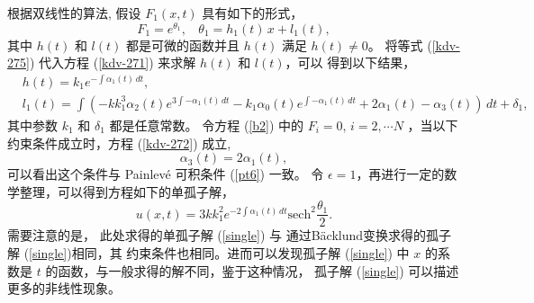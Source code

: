 根据双线性的算法, 假设 $F_1(x,t)$ 具有如下的形式，
\begin{equation}
 F_1=e^{\theta_1},\ \ \ \  \theta_1=h_1(t)\,x+l_1(t), \label{kdv-275}
\end{equation}
其中 $ h(t) $ 和 $ l(t) $ 都是可微的函数并且 $h(t)$ 满足 $ h(t)\neq 0 $。
将等式 (\ref{kdv-275}) 代入方程 (\ref{kdv-271}) 来求解 $ h(t) $ 和 $ l(t) $，可以
得到以下结果，
\begin{align}
&h(t)=k_1 e^{-\int \alpha _1(t) \, dt},
\\&
l_1(t)=\int \left(- k k_1^3 \alpha _2(t)e^{3 \int -\alpha _1(t) \, dt}-k_1 \alpha _0(t) e^{\int -\alpha _1(t) \, dt}+2 \alpha _1(t)-\alpha _3(t)\right) \, dt+ \delta_1,
\end{align}
其中参数 $k_1$ 和 $\delta_1$ 都是任意常数。
令方程 (\ref{b2}) 中的 $F_i=0, \,i=2,\cdots N $ ，当以下约束条件成立时，方程 (\ref{kdv-272}) 成立,
\begin{equation}
\alpha _3(t)=2\alpha _1(t),\label{kdv-b3}
\end{equation}
可以看出这个条件与 Painlev\'{e} 可积条件 (\ref{pt6}) 一致。
令 $\epsilon=1$，再进行一定的数学整理，可以得到方程如下的单孤子解，
\begin{equation}
u(x,t)=3 k k_1^2 e^{-2 \int \alpha _1(t) \, dt}
\text{sech}^2\frac{\theta_1}{2}. \label{single}
\end{equation}
需要注意的是， 此处求得的单孤子解 (\ref{single}) 与 通过B\"{a}cklund变换求得的孤子解 (\ref{single})相同，其
约束条件也相同。进而可以发现孤子解 (\ref{single}) 中 $x$ 的系数是 $t$ 的函数，与一般求得的解不同，鉴于这种情况， 孤子解 (\ref{single}) 可以描述更多的非线性现象。

\vspace{1mm}
\vspace{2mm}

